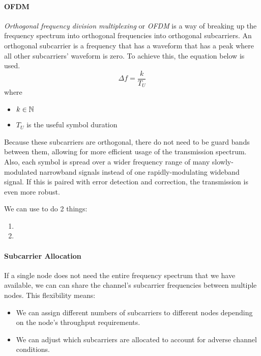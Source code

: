 \paragraph{OFDM}\label{par:OFDM}
\begin{definition}\label{def:OFDM}
  \emph{Orthogonal frequency division multiplexing} or \emph{OFDM} is a way of breaking up the frequency spectrum into orthogonal frequencies into orthogonal subcarriers.
  An orthogonal subcarrier is a frequency that has a waveform that has a peak where all other subcarriers' waveform is zero.
  To achieve this, the equation below is used.
  \begin{equation}\label{eq:Orthogonal_Subcarrier}
    \Delta f = \frac{k}{T_{U}}
  \end{equation}
  where
  \begin{itemize}[noitemsep]
  \item $k \in \operatorname{\mathbb{N}}$
  \item $T_{U}$ is the useful symbol duration
  \end{itemize}

  Because these subcarriers are orthogonal, there do not need to be guard bands between them, allowing for more efficient usage of the transmission spectrum.
  Also, each symbol is spread over a wider frequency range of many slowly-modulated narrowband signals instead of one rapidly-modulating wideband signal.
  If this is paired with error detection and correction, the transmission is even more robust.
\end{definition}

We can use  to do 2 things:
\begin{enumerate}[noitemsep]
\item {}
\item {}
\end{enumerate}

\paragraph{Subcarrier Allocation}\label{par:Subcarrier_Allocation}
If a single node does not need the entire frequency spectrum that we have available, we can can share the channel's subcarrier frequencies between multiple nodes.
This flexibility means:
\begin{itemize}[noitemsep]
\item We can assign different numbers of subcarriers to different nodes depending on the node's throughput requirements.
\item We can adjust which subcarriers are allocated to account for adverse channel conditions.
\end{itemize}

